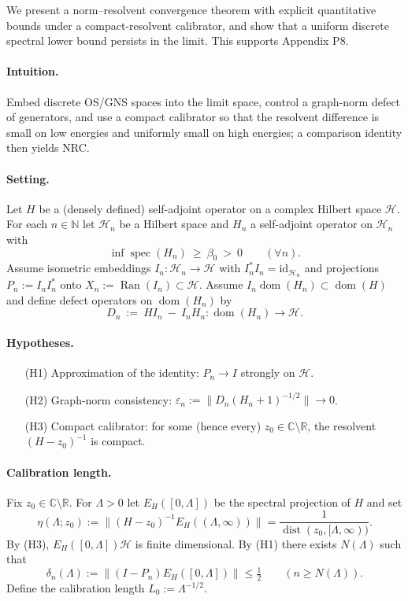 \documentclass[11pt]{amsart}
\theoremstyle{plain}
\theoremstyle{definition}
\theoremstyle{remark}
\begin{document}
We present a norm–resolvent convergence theorem with explicit quantitative bounds under a compact-resolvent calibrator, and show that a uniform discrete spectral lower bound persists in the limit. This supports Appendix P8.

\paragraph{Intuition.} Embed discrete OS/GNS spaces into the limit space, control a graph-norm defect of generators, and use a compact calibrator so that the resolvent difference is small on low energies and uniformly small on high energies; a comparison identity then yields NRC.

\paragraph{Setting.}
Let $H$ be a (densely defined) self-adjoint operator on a complex Hilbert space $\mathcal H$. For each $n\in\mathbb N$ let $\mathcal H_n$ be a Hilbert space and $H_n$ a self-adjoint operator on $\mathcal H_n$ with
\[
  \inf\operatorname{spec}(H_n)\ \ge\ \beta_0\ >\ 0\qquad(\forall n).
\]
Assume isometric embeddings $I_n:\mathcal H_n\to\mathcal H$ with $I_n^*I_n=\mathrm{id}_{\mathcal H_n}$ and projections $P_n:=I_n I_n^*$ onto $X_n:=\operatorname{Ran}(I_n)\subset\mathcal H$. Assume $I_n\operatorname{dom}(H_n)\subset\operatorname{dom}(H)$ and define defect operators on $\operatorname{dom}(H_n)$ by
\[
  D_n\ :=\ H I_n\ -\ I_n H_n: \operatorname{dom}(H_n)\to\mathcal H.
\]
\paragraph{Hypotheses.}
\begin{itemize}
  \item[(H1)] Approximation of the identity: $P_n\to I$ strongly on $\mathcal H$.
  \item[(H2)] Graph-norm consistency: $\varepsilon_n:=\bigl\| D_n (H_n+1)^{-1/2}\bigr\|\to 0$.
  \item[(H3)] Compact calibrator: for some (hence every) $z_0\in\mathbb C\setminus\mathbb R$, the resolvent $(H-z_0)^{-1}$ is compact.
\end{itemize}
\paragraph{Calibration length.}
Fix $z_0\in\mathbb C\setminus\mathbb R$. For $\Lambda>0$ let $E_H([0,\Lambda])$ be the spectral projection of $H$ and set
\[
  \eta(\Lambda;z_0):=\bigl\|(H-z_0)^{-1} E_H((\Lambda,\infty))\bigr\|=\frac{1}{\operatorname{dist}(z_0,[\Lambda,\infty))}.
\]
By (H3), $E_H([0,\Lambda])\mathcal H$ is finite dimensional. By (H1) there exists $N(\Lambda)$ such that
\[
  \delta_n(\Lambda):=\bigl\|(I-P_n) E_H([0,\Lambda])\bigr\|\le \tfrac12\qquad(n\ge N(\Lambda)).
\]
Define the calibration length $L_0:=\Lambda^{-1/2}$.
\end{document}
